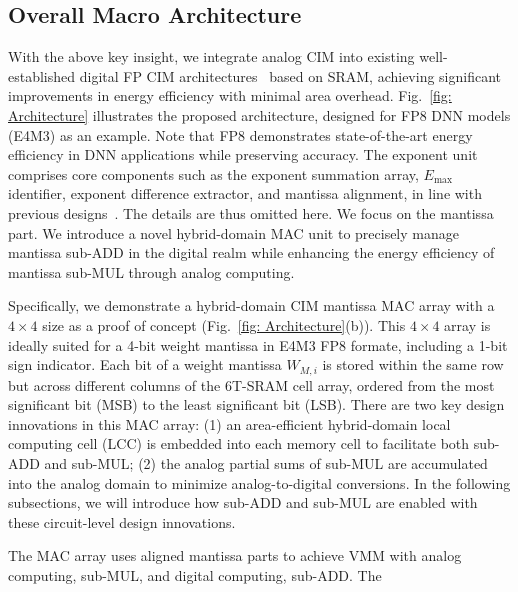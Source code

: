 \label{sec:method}









\subsection{Overall Macro Architecture}




With the above key insight, we integrate analog CIM into existing well-established digital FP CIM architectures~\cite{SRAM_CIM_FP_1,SRAM_CIM_INT_1} based on SRAM, achieving significant improvements in energy efficiency with minimal area overhead.
Fig.~\ref{fig: Architecture} illustrates the proposed architecture, designed for FP8 DNN models (E4M3) as an example.
Note that FP8 demonstrates state-of-the-art energy efficiency in DNN applications while preserving accuracy\cite{micikevicius2022fp8}. 
The exponent unit comprises core components such as the exponent summation array, $E_{\text{max}}$ identifier, exponent difference extractor, and mantissa alignment, in line with previous designs~\cite{time_domain,SRAM_CIM_FP_1}. 
The details are thus omitted here.
We focus on the mantissa part.
We introduce a novel hybrid-domain MAC unit to precisely manage mantissa sub-ADD in the digital realm while enhancing the energy efficiency of mantissa sub-MUL through analog computing.


Specifically, we demonstrate a hybrid-domain CIM mantissa MAC array with a $4 \times 4$ size as a proof of concept (Fig.~\ref{fig: Architecture}(b)). 
This $4 \times 4$ array is ideally suited for a 4-bit weight mantissa in E4M3 FP8 formate, including a 1-bit sign indicator.
Each bit of a weight mantissa $W_{M,i}$ is stored within the same row but across different columns of the 6T-SRAM cell array, ordered from the most significant bit (MSB) to the least significant bit (LSB).
There are two key design innovations in this MAC array: (1) an area-efficient hybrid-domain local computing cell (LCC) is embedded into each memory cell to facilitate both sub-ADD and sub-MUL;
(2) the analog partial sums of sub-MUL are accumulated into the analog domain to minimize analog-to-digital conversions.
In the following subsections, we will introduce how sub-ADD and sub-MUL are enabled with these circuit-level design innovations.

\iffalse
The MAC array uses aligned mantissa parts to achieve VMM with analog computing, sub-MUL, and digital computing, sub-ADD. 
The 

